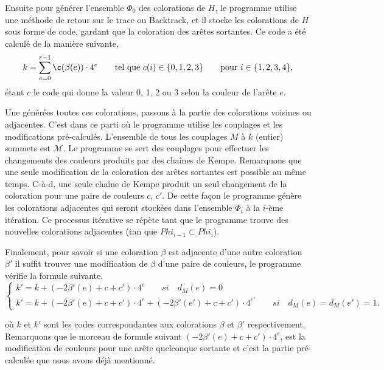 \documentclass[10pt,a4paper]{article}
\begin{document}
Ensuite pour générer l'ensemble $\Phi_0$ des colorations de $H$, le programme utilise une méthode de retour sur le trace ou Backtrack, et il stocke les colorations de $H$ sous forme de code, gardant que la coloration des arêtes sortantes. Ce code a été calculé de la manière suivante,
$$
k = \sum_{e=0}^{r-1} \c(\beta(e)) \cdot 4^{e} \qquad \textrm{tel que   } c(i) \in \{ 0,1,2,3 \} \qquad \textrm{pour  } i \in \{1,2,3,4 \},
$$
étant $c$ le code qui donne la valeur 0, 1, 2 ou 3 selon la couleur de l'arête $e$.

Une générées toutes ces colorations, passons à la partie des colorations voisines ou adjacentes. C'est dans ce parti où le programme utilise les couplages et les modifications pré-calculés. L'ensemble de tous les couplages $M$ à $k$ (entier) sommets est $\mathcal{M}$. Le programme se sert des couplages pour effectuer les changements des couleurs produits par des chaînes de Kempe. Remarquons que une seule modification de la coloration des arêtes sortantes est possible au même temps. C-à-d, une seule chaîne de Kempe produit un seul changement de la coloration pour une paire de couleurs $c$, $c'$. De cette façon le programme génère les colorations adjacentes qui seront stockées dans l'ensemble $\Phi_i$ à la $i$-ème itération. Ce processus itérative se répète tant que le programme trouve des nouvelles colorations adjacentes (tan que $Phi_{i-1} \subset Phi_i$).

Finalement, pour savoir si une coloration $\beta$ est adjacente d'une autre coloration $\beta'$ il suffit trouver une modification de $\beta$ d'une paire de couleurs, le programme vérifie la formule suivante,
$$
\begin{cases}
k' =  k + (-2\beta'(e)+c + c')\cdot 4^{e} \qquad si \quad d_M(e)=0\\
k' = k  + (-2\beta'(e)+c + c')\cdot 4^{e} + (-2\beta'(e')+c + c')\cdot 4^{e'} \qquad si \quad d_M(e) = d_M(e') = 1.
\end{cases}
$$

où $k$ et $k'$ sont les codes correspondantes aux colorations $\beta$ et $\beta'$ respectivement. Remarquons que le morceau de formule suivant $(-2\beta'(e)+c + c')\cdot 4^{e}$, est la modification de couleurs pour une arête quelconque sortante et c'est la partie pré-calculée que nous avons déjà mentionné.
\end{document}
